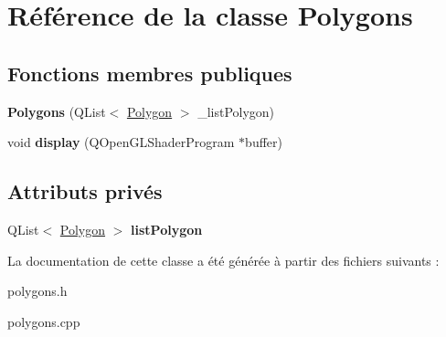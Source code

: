 \hypertarget{classPolygons}{}\section{Référence de la classe Polygons}
\label{classPolygons}
\subsection*{Fonctions membres publiques}
\begin{DoxyCompactItemize}
\item 
\mbox{\label{classPolygons_af1599f3793e80e16097f52337da95ecc}} 
{\bfseries Polygons} (Q\+List$<$ \hyperlink{classPolygon}{Polygon} $>$ \+\_\+list\+Polygon)
\item 
\mbox{\label{classPolygons_a256325f896a2ad84153302453e7fe9b8}} 
void {\bfseries display} (Q\+Open\+G\+L\+Shader\+Program $\ast$buffer)
\end{DoxyCompactItemize}
\subsection*{Attributs privés}
\begin{DoxyCompactItemize}
\item 
\mbox{\label{classPolygons_a551188dc85cb3c2e61affdd20b60f67f}} 
Q\+List$<$ \hyperlink{classPolygon}{Polygon} $>$ {\bfseries list\+Polygon}
\end{DoxyCompactItemize}


La documentation de cette classe a été générée à partir des fichiers suivants \+:\begin{DoxyCompactItemize}
\item 
polygons.\+h\item 
polygons.\+cpp\end{DoxyCompactItemize}
